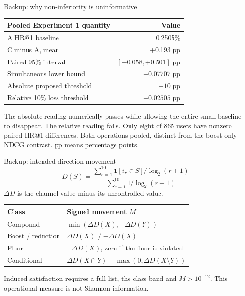 \documentclass[10pt]{beamer}
\newcommand{\toprule}{\hline}
\newcommand{\midrule}{\hline}
\newcommand{\bottomrule}{\hline}
\newcommand{\src}[1]{\vfill{\tiny\color{bcitgray}#1}}
\begin{document}
\begin{frame}{Backup: why non-inferiority is uninformative}
\small
\begin{tabular}{@{}P{6.6cm}r@{}}
\toprule
Pooled Experiment 1 quantity & Value\\\midrule
A HR@1 baseline & 0.2505\%\\
C minus A, mean & +0.193 pp\\
Paired 95\% interval & $[-0.058,+0.501]$ pp\\
Simultaneous lower bound & $-0.07707$ pp\\
Absolute proposed threshold & $-10$ pp\\
Relative 10\% loss threshold & $-0.02505$ pp\\\bottomrule
\end{tabular}\par
\vspace{0.3cm}
The absolute reading numerically passes while allowing the entire small baseline to disappear. The relative reading fails. Only eight of 865 users have nonzero paired HR@1 differences.
\src{Both operations pooled, distinct from the boost-only NDCG contrast. pp means percentage points.}
\end{frame}

\begin{frame}{Backup: intended-direction movement}
\small
\[
D(S)=\frac{\sum_{r=1}^{10}\mathbf{1}[i_r\in S]/\log_2(r+1)}{\sum_{r=1}^{10}1/\log_2(r+1)}
\]
$\Delta D$ is the channel value minus its uncontrolled value.
\begin{tabular}{@{}P{2.7cm}P{7.0cm}@{}}
\toprule
Class & Signed movement $M$\\\midrule
Compound & $\min(\Delta D(X),-\Delta D(Y))$\\
Boost / reduction & $\Delta D(X)$ / $-\Delta D(X)$\\
Floor & $-\Delta D(X)$, zero if the floor is violated\\
Conditional & $\Delta D(X\cap Y)-\max(0,\Delta D(X\setminus Y))$\\\bottomrule
\end{tabular}\par
\vspace{0.25cm}
Induced satisfaction requires a full list, the class band and $M>10^{-12}$. This operational measure is not Shannon information.
\end{frame}
\end{document}
